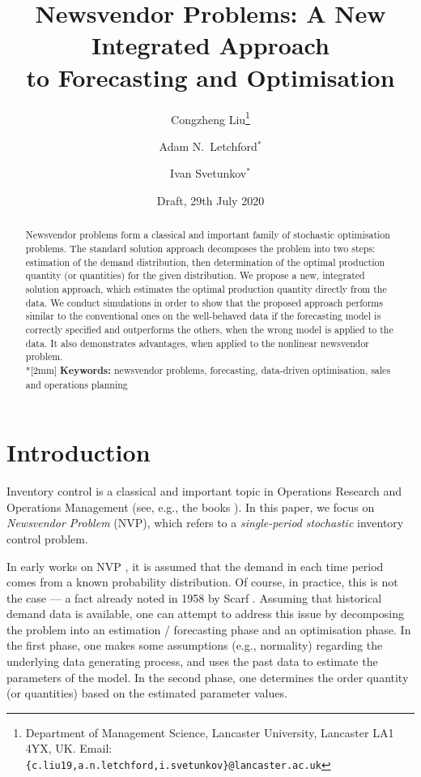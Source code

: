 \documentclass{article}
\title{Newsvendor Problems: A New Integrated Approach\\ to Forecasting and Optimisation}
\author{Congzheng Liu\thanks{Department of Management Science,
Lancaster University, Lancaster LA1 4YX, UK.
Email: {\tt \{c.liu19,a.n.letchford,i.svetunkov\}@lancaster.ac.uk}}
\and Adam N.\ Letchford$^*$ \and Ivan Svetunkov$^*$} %
\date{Draft, 29th July 2020}
\begin{document}
\maketitle

\begin{abstract}
Newsvendor problems form a classical and important family of stochastic optimisation problems. The standard solution approach decomposes the problem into two steps: estimation of the demand distribution, then determination of the optimal production quantity (or quantities) for the given distribution. We propose a new, integrated solution approach, which estimates the optimal production quantity directly from the data. We conduct simulations in order to show that the proposed approach performs similar to the conventional ones on the well-behaved data if the forecasting model is correctly specified and outperforms the others, when the wrong model is applied to the data. It also demonstrates advantages, when applied to the nonlinear newsvendor problem.%
\\*[2mm]
{\bf Keywords:} newsvendor problems, forecasting, data-driven optimisation, sales and operations planning
\end{abstract}


\section{Introduction}

Inventory control is a classical and important topic in Operations Research and Operations Management (see, e.g., the books \cite{Po02,SPP98,Zi00}). In this paper, we focus on \emph{Newsvendor Problem} (NVP), which refers to a \emph{single-period} \emph{stochastic} inventory control problem.

In early works on NVP \cite{AHM51,MK51}, it is assumed that the demand in each time period comes from a known probability distribution. Of course, in practice, this is not the case --- a fact already noted in 1958 by Scarf \cite{Sc58}. Assuming that historical demand data is available, one can attempt to address this issue by decomposing the problem into an estimation / forecasting phase and an optimisation phase.
In the first phase, one makes some assumptions (e.g., normality) regarding the underlying data generating process, and uses the past data to estimate the parameters of the model.
In the second phase, one determines the order quantity (or quantities) based on the estimated parameter values.
\end{document}
